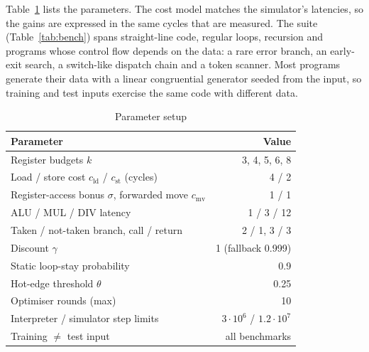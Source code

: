 \documentclass[conference]{IEEEtran}
\newcommand{\cld}{c_{\mathrm{ld}}}
\newcommand{\cst}{c_{\mathrm{st}}}
\newcommand{\csv}{\sigma}
\newcommand{\cmv}{c_{\mathrm{mv}}}
\begin{document}
Table~\ref{tab:params} lists the parameters. The cost model matches the
simulator's latencies, so the gains are expressed in the same cycles
that are measured. The suite (Table~\ref{tab:bench}) spans straight-line
code, regular loops, recursion and programs whose control flow depends
on the data: a rare error branch, an early-exit search, a switch-like
dispatch chain and a token scanner. Most programs generate their data
with a linear congruential generator seeded from the input, so training
and test inputs exercise the same code with different data.

\begin{table}[t]
\centering
\caption{Parameter setup}
\label{tab:params}
\footnotesize
\begin{tabular}{@{}lr@{}}
\toprule
Parameter & Value \\
\midrule
Register budgets $k$ & 3, 4, 5, 6, 8 \\
Load / store cost $\cld$ / $\cst$ (cycles) & 4 / 2 \\
Register-access bonus $\csv$, forwarded move $\cmv$ & 1 / 1 \\
ALU / MUL / DIV latency & 1 / 3 / 12 \\
Taken / not-taken branch, call / return & 2 / 1, 3 / 3 \\
Discount $\gamma$ & 1 (fallback 0.999) \\
Static loop-stay probability & 0.9 \\
Hot-edge threshold $\theta$ & 0.25 \\
Optimiser rounds (max) & 10 \\
Interpreter / simulator step limits & $3\cdot10^6$ / $1.2\cdot10^7$ \\
Training $\neq$ test input & all benchmarks \\
\bottomrule
\end{tabular}
\end{table}
\end{document}
